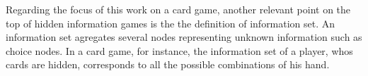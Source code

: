 Regarding the focus of this work on a card game, another relevant point on the top of hidden information games is the the definition of information set.
An information set agregates several nodes representing unknown information such as choice nodes. In a card game, for instance, the information set of a player, whos cards are hidden, corresponds to all the possible combinations of his hand.



